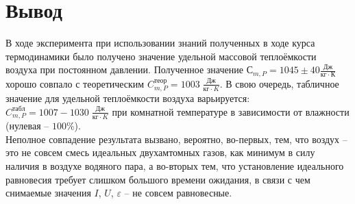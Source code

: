 \documentclass[a4paper,12pt]{article}
\begin{document}
	\section{Вывод}
	
	В ходе эксперимента при использовании знаний полученных в ходе курса термодинамики было получено значение удельной массовой теплоёмкости воздуха при постоянном давлении. Полученное значение $С_{m, P} = 1045 \pm 40 \frac{Дж}{кг\cdot К}$ хорошо совпало с теоретическим $C_{m, P}^{теор} = 1003 \; \frac{Дж}{кг\cdot K}$. В свою очередь, табличное значение для удельной теплоёмкости воздуха варьируется: $C_{m, P}^{табл} = 1007-1030 \; \frac{Дж}{кг\cdot K}$ при комнатной температуре в зависимости от влажности (нулевая -- $100\%$).
	\\ Неполное совпадение результата вызвано, вероятно, во-первых, тем, что воздух -- это не совсем смесь идеальных двухамтомных газов, как минимум в силу наличия в воздухе водяного пара, а во-вторых тем, что установление идеального равновесия требует слишком большого времени ожидания, в связи с чем снимаемые значения $I$, $U$, $\varepsilon$ -- не совсем равновесные.
	
\end{document}
